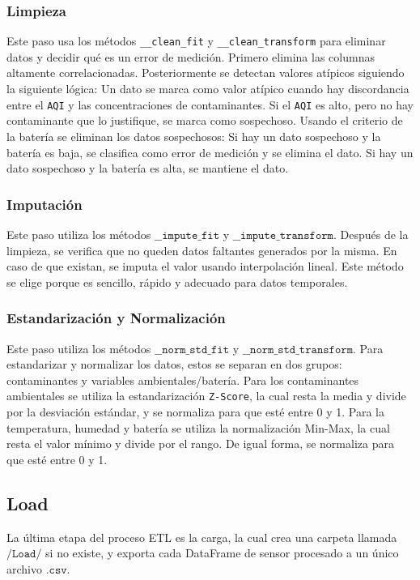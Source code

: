 \documentclass{article}
\begin{document}
\subsubsection{Limpieza}
Este paso usa los métodos \texttt{\_\_clean\_fit} y \texttt{\_\_clean\_transform} para eliminar datos y decidir qué es un
error de medición.
Primero elimina las columnas altamente correlacionadas. Posteriormente se detectan valores atípicos siguiendo la
siguiente lógica:
Un dato se marca como valor atípico cuando hay discordancia entre el \texttt{AQI} y las concentraciones de contaminantes. Si el \texttt{AQI} es alto, pero no hay
contaminante que lo justifique, se marca como sospechoso. Usando el criterio de la batería se eliminan los datos sospechosos:
Si hay un dato sospechoso y la batería es baja, se clasifica como error de medición y se elimina el dato. Si hay un dato 
sospechoso y la batería es alta, se mantiene el dato. 
\subsubsection{Imputación}
Este paso utiliza los métodos $\texttt{\_\_impute\_fit}$ y $\texttt{\_\_impute\_transform}$.
Después de la limpieza, se verifica que no queden datos faltantes generados por la misma. En caso de que existan, se imputa 
el valor usando interpolación lineal. Este método se elige porque es sencillo, rápido y adecuado para datos temporales. 

\subsubsection{Estandarización y Normalización}
Este paso utiliza los métodos $\texttt{\_\_norm\_std\_fit}$ y $\texttt{\_\_norm\_std\_transform}$.
Para estandarizar y normalizar los datos, estos se separan en dos grupos: contaminantes y variables ambientales/batería.
Para los contaminantes ambientales se utiliza la estandarización \texttt{Z-Score}, la cual resta la media y divide por la
desviación estándar, y se normaliza para que esté entre 0 y 1.
Para la temperatura, humedad y batería se utiliza la normalización Min-Max, la cual resta el valor mínimo y divide por el 
rango. De igual forma, se normaliza para que esté entre 0 y 1.
\subsection{Load}
La última etapa del proceso ETL es la carga, la cual crea una carpeta llamada $\texttt{/Load/}$ si no existe, y exporta cada
DataFrame de sensor procesado a un único archivo $\texttt{.csv}$.
\end{document}
